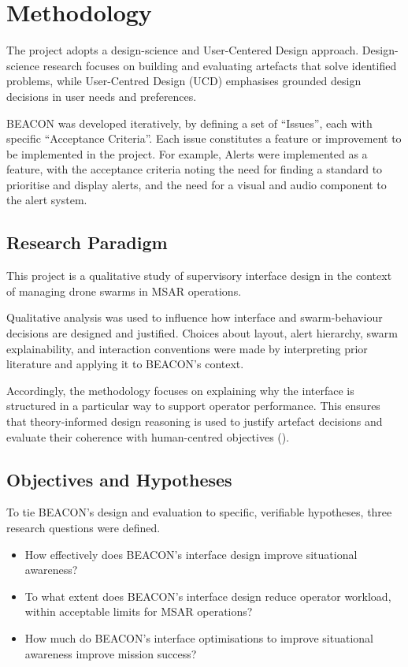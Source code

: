 \section{Methodology}\label{sec:methodology}

The project adopts a design-science and User-Centered Design approach.
Design-science research focuses on building and evaluating artefacts that solve identified problems, while User-Centred Design (UCD) emphasises grounded design decisions in user needs and preferences.

BEACON was developed iteratively, by defining a set of ``Issues'', each with specific ``Acceptance Criteria''.
Each issue constitutes a feature or improvement to be implemented in the project.
For example, Alerts were implemented as a feature, with the acceptance criteria noting the need for finding a standard to prioritise and display alerts, and the need for a visual and audio component to the alert system.

\subsection{Research Paradigm}\label{subsec:research-paradigm}

This project is a qualitative study of supervisory interface design in the context of managing drone swarms in MSAR operations.

Qualitative analysis was used to influence how interface and swarm-behaviour decisions are designed and justified.
Choices about layout, alert hierarchy, swarm explainability, and interaction conventions were made by interpreting prior literature and applying it to BEACON's context.

Accordingly, the methodology focuses on explaining why the interface is structured in a particular way to support operator performance.
This ensures that theory-informed design reasoning is used to justify artefact decisions and evaluate their coherence with human-centred objectives (\cite{BABAEI2025103515}).

\subsection{Objectives and Hypotheses}\label{subsec:objectives-and-hypotheses}

To tie BEACON's design and evaluation to specific, verifiable hypotheses, three research questions were defined.

\begin{itemize}
    \item How effectively does BEACON's interface design improve situational awareness?
    \item To what extent does BEACON's interface design reduce operator workload, within acceptable limits for MSAR operations?
    \item How much do BEACON's interface optimisations to improve situational awareness improve mission success?
\end{itemize}

